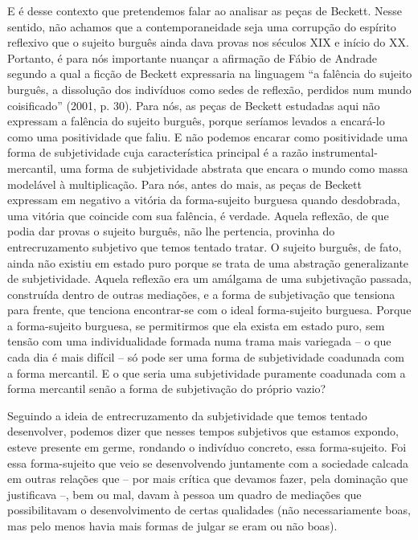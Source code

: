 E é desse contexto que pretendemos falar ao analisar as peças de
Beckett. Nesse sentido, não achamos que a contemporaneidade seja uma
corrupção do espírito reflexivo que o sujeito burguês ainda dava provas
nos séculos XIX e início do XX. Portanto, é para nós importante nuançar
a afirmação de Fábio de Andrade segundo a qual a ficção de Beckett
expressaria na linguagem ``a falência do sujeito burguês, a dissolução
dos indivíduos como sedes de reflexão, perdidos num mundo coisificado''
(2001, p. 30). Para nós, as peças de Beckett estudadas aqui não
expressam a falência do sujeito burguês, porque seríamos levados a
encará-lo como uma positividade que faliu. E não podemos encarar como
positividade uma forma de subjetividade cuja característica principal é
a razão instrumental-mercantil, uma forma de subjetividade abstrata que
encara o mundo como massa modelável à multiplicação. Para nós, antes do
mais, as peças de Beckett expressam em negativo a vitória da
forma-sujeito burguesa quando desdobrada, uma vitória que coincide com
sua falência, é verdade. Aquela reflexão, de que podia dar provas o
sujeito burguês, não lhe pertencia, provinha do entrecruzamento
subjetivo que temos tentado tratar. O sujeito burguês, de fato, ainda
não existiu em estado puro porque se trata de uma abstração
generalizante de subjetividade. Aquela reflexão era um amálgama de uma
subjetivação passada, construída dentro de outras mediações, e a forma
de subjetivação que tensiona para frente, que tenciona encontrar-se com
o ideal forma-sujeito burguesa. Porque a forma-sujeito burguesa, se
permitirmos que ela exista em estado puro, sem tensão com uma
individualidade formada numa trama mais variegada -- o que cada dia é
mais difícil -- só pode ser uma forma de subjetividade coadunada com a
forma mercantil. E o que seria uma subjetividade puramente coadunada com
a forma mercantil senão a forma de subjetivação do próprio vazio?

Seguindo a ideia de entrecruzamento da subjetividade que temos tentado
desenvolver, podemos dizer que nesses tempos subjetivos que estamos
expondo, esteve presente em germe, rondando o indivíduo concreto, essa
forma-sujeito. Foi essa forma-sujeito que veio se desenvolvendo
juntamente com a sociedade calcada em outras relações que -- por mais
crítica que devamos fazer, pela dominação que justificava --, bem ou
mal, davam à pessoa um quadro de mediações que possibilitavam o
desenvolvimento de certas qualidades (não necessariamente boas, mas pelo
menos havia mais formas de julgar se eram ou não boas).

